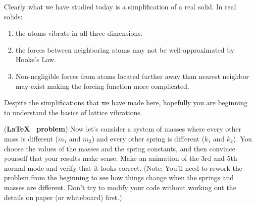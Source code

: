 Clearly what we have studied today is a simplification of a real
solid.  In real solids:
\begin{enumerate}
\item the atoms vibrate in all three dimensions.
\item the forces between neighboring atoms may not be
  well-approximated by Hooke's Law.
\item Non-negligible forces from atoms located further away than
  nearest neighbor may exist making the forcing function more complicated.
\end{enumerate}

Despite the simplifications that we have made here, hopefully you are
beginning to understand the basics of lattice vibrations.

\begin{enumerate}
\prob  (\textbf{\LaTeX~ problem}) Now let's consider a system of masses where every other mass is
different ($m_1$ and $m_2$) and every other spring is different  ($k_1$
and $k_2$).  You choose the values
of the masses and the spring constants, and then convince yourself
that your results make sense.  Make an animation of the 3rd
and 5th normal mode and verify that it looks correct. (Note: You'll need to
rework the problem from the beginning to see how things change when
the springs and masses are different.  Don't try to modify your code
without working out the details on paper (or whiteboard) first.)
\end{enumerate}



